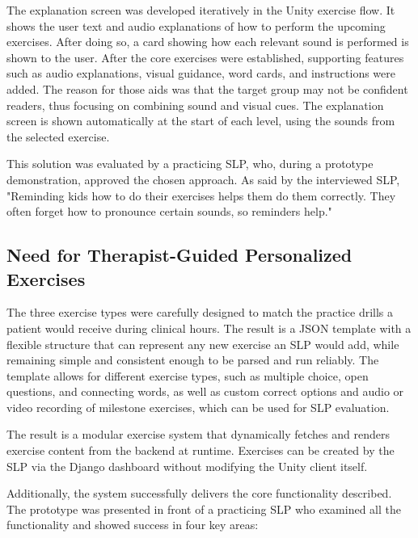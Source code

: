 The explanation screen was developed iteratively in the Unity exercise flow. It shows the user text and audio explanations of how to perform the upcoming exercises. After doing so, a card showing how each relevant sound is performed is shown to the user. After the core exercises were established, supporting features such as audio explanations, visual guidance, word cards, and instructions were added. The reason for those aids was that the target group may not be confident readers, thus focusing on combining sound and visual cues. The explanation screen is shown automatically at the start of each level, using the sounds from the selected exercise. 

This solution was evaluated by a practicing SLP, who, during a prototype demonstration, approved the chosen approach. As said by the interviewed SLP, "Reminding kids how to do their exercises helps them do them correctly. They often forget how to pronounce certain sounds, so reminders help."

\subsection{Need for Therapist-Guided Personalized Exercises}
\label{subsec:need-for-therapist-guided-personalized-exercises}

The three exercise types were carefully designed to match the practice drills a patient would receive during clinical hours. The result is a JSON template with a flexible structure that can represent any new exercise an SLP would add, while remaining simple and consistent enough to be parsed and run reliably. The template allows for different exercise types, such as multiple choice, open questions, and connecting words, as well as custom correct options and audio or video recording of milestone exercises, which can be used for SLP evaluation.

The result is a modular exercise system that dynamically fetches and renders exercise content from the backend at runtime. Exercises can be created by the SLP via the Django dashboard without modifying the Unity client itself.

Additionally, the system successfully delivers the core functionality described. The prototype was presented in front of a practicing SLP who examined all the functionality and showed success in four key areas:

